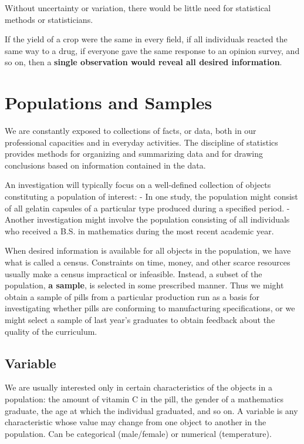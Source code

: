 \documentclass[]{book}
\theoremstyle{definition}
\theoremstyle{definition}
\theoremstyle{definition}
\theoremstyle{remark}
\let\BeginKnitrBlock\begin \let\EndKnitrBlock\end
\begin{document}
\BeginKnitrBlock{rmdimportant}
Without uncertainty or variation, there would be little need for
statistical methods or statisticians.
\EndKnitrBlock{rmdimportant}

If the yield of a crop were the same in every field, if all individuals
reacted the same way to a drug, if everyone gave the same response to an
opinion survey, and so on, then a \textbf{single observation would
reveal all desired information}.

\section{Populations and Samples}\label{populations-and-samples}

We are constantly exposed to collections of facts, or data, both in our
professional capacities and in everyday activities. The discipline of
statistics provides methods for organizing and summarizing data and for
drawing conclusions based on information contained in the data.

An investigation will typically focus on a well-defined collection of
objects constituting a population of interest: - In one study, the
population might consist of all gelatin capsules of a particular type
produced during a specified period. - Another investigation might
involve the population consisting of all individuals who received a B.S.
in mathematics during the most recent academic year.

When desired information is available for all objects in the population,
we have what is called a census. Constraints on time, money, and other
scarce resources usually make a census impractical or infeasible.
Instead, a subset of the population, \textbf{a sample}, is selected in
some prescribed manner. Thus we might obtain a sample of pills from a
particular production run as a basis for investigating whether pills are
conforming to manufacturing specifications, or we might select a sample
of last year's graduates to obtain feedback about the quality of the
curriculum.

\subsection{Variable}\label{variable}

We are usually interested only in certain characteristics of the objects
in a population: the amount of vitamin C in the pill, the gender of a
mathematics graduate, the age at which the individual graduated, and so
on. A variable is any characteristic whose value may change from one
object to another in the population. Can be categorical (male/female) or
numerical (temperature).
\end{document}
